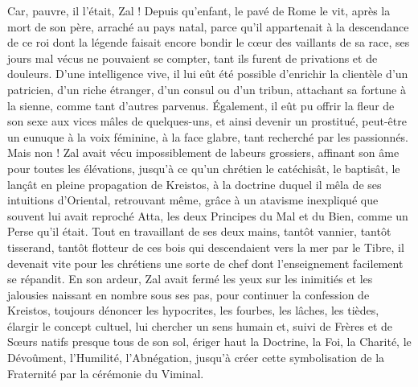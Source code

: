 \documentclass[a4paper, 11pt, oneside, polutonikogreek, french]{article}
\begin{document}
Car, pauvre, il l'était, Zal ! Depuis qu'enfant, le pavé de Rome le vit, après la mort de son père, arraché au pays natal, parce qu'il appartenait à la descendance de ce roi dont la légende faisait encore bondir le cœur des vaillants de sa race, ses jours mal vécus ne pouvaient se compter, tant ils furent de privations et de douleurs. D'une intelligence vive, il lui eût été possible d'enrichir la clientèle d'un patricien, d'un riche étranger, d'un consul ou d'un tribun, attachant sa fortune à la sienne, comme tant d'autres parvenus. Également, il eût pu offrir la fleur de son sexe aux vices mâles de quelques-uns, et ainsi devenir un prostitué, peut-être un eunuque à la voix féminine, à la face glabre, tant recherché par les passionnés. Mais non ! Zal avait vécu impossiblement de labeurs grossiers, affinant son âme pour toutes les élévations, jusqu'à ce qu'un chrétien le catéchisât, le baptisât, le lançât en pleine propagation de Kreistos, à la doctrine duquel il mêla de ses intuitions d'Oriental, retrouvant même, grâce à un atavisme inexpliqué que souvent lui avait reproché Atta, les deux Principes du Mal et du Bien, comme un Perse qu'il était. Tout en travaillant de ses deux mains, tantôt vannier, tantôt tisserand, tantôt flotteur de ces bois qui descendaient vers la mer par le Tibre, il devenait vite pour les chrétiens une sorte de chef dont l'enseignement facilement se répandit. En son ardeur, Zal avait fermé les yeux sur les inimitiés et les jalousies naissant en nombre sous ses pas, pour continuer la confession de Kreistos, toujours dénoncer les hypocrites, les fourbes, les lâches, les tièdes, élargir le concept cultuel, lui chercher un sens humain et, suivi de Frères et de Sœurs natifs presque tous de son sol, ériger haut la Doctrine, la Foi, la Charité, le Dévoûment, l'Humilité, l'Abnégation, jusqu'à créer cette symbolisation de la Fraternité par la cérémonie du Viminal.
\end{document}
